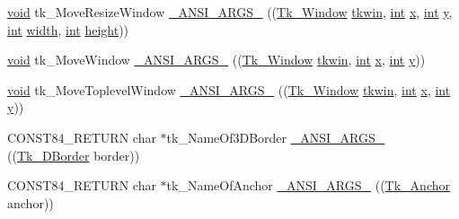 \begin{DoxyCompactItemize}
\item 
\hyperlink{tk_8h_aba408b7cd755a96426e004c015f5de8e}{void} tk\+\_\+\+Move\+Resize\+Window \hyperlink{struct_tk_stubs_aa3b45fa26bcd8bb64b33075c9c378c23}{\+\_\+\+A\+N\+S\+I\+\_\+\+A\+R\+G\+S\+\_\+} ((\hyperlink{tk_8h_ab756137de3ee74edc2501bd0d761e37c}{Tk\+\_\+\+Window} \hyperlink{tk_8h_a35df722e7e1b6efd651683b8be7c1490}{tkwin}, \hyperlink{tk_8h_a83f82f76e7fed06f4c49d2db94028a6d}{int} \hyperlink{tk_8h_a61ebd54d47cc56787649a3b8f126bda1}{x}, \hyperlink{tk_8h_a83f82f76e7fed06f4c49d2db94028a6d}{int} \hyperlink{tk_8h_a40f4f3601c0eaa8ca46b1a164264696d}{y}, \hyperlink{tk_8h_a83f82f76e7fed06f4c49d2db94028a6d}{int} \hyperlink{tk_8h_a29e50a5401c1396b3a2aa3487f74d468}{width}, \hyperlink{tk_8h_a83f82f76e7fed06f4c49d2db94028a6d}{int} \hyperlink{tk_8h_a67be2f4b9d9c5b3559139bfb072e2e81}{height}))
\item 
\hyperlink{tk_8h_aba408b7cd755a96426e004c015f5de8e}{void} tk\+\_\+\+Move\+Window \hyperlink{struct_tk_stubs_a315704b61e9a1ca82adff2f37e0078a0}{\+\_\+\+A\+N\+S\+I\+\_\+\+A\+R\+G\+S\+\_\+} ((\hyperlink{tk_8h_ab756137de3ee74edc2501bd0d761e37c}{Tk\+\_\+\+Window} \hyperlink{tk_8h_a35df722e7e1b6efd651683b8be7c1490}{tkwin}, \hyperlink{tk_8h_a83f82f76e7fed06f4c49d2db94028a6d}{int} \hyperlink{tk_8h_a61ebd54d47cc56787649a3b8f126bda1}{x}, \hyperlink{tk_8h_a83f82f76e7fed06f4c49d2db94028a6d}{int} \hyperlink{tk_8h_a40f4f3601c0eaa8ca46b1a164264696d}{y}))
\item 
\hyperlink{tk_8h_aba408b7cd755a96426e004c015f5de8e}{void} tk\+\_\+\+Move\+Toplevel\+Window \hyperlink{struct_tk_stubs_a79a74ac86bbebb79aea754080de6df21}{\+\_\+\+A\+N\+S\+I\+\_\+\+A\+R\+G\+S\+\_\+} ((\hyperlink{tk_8h_ab756137de3ee74edc2501bd0d761e37c}{Tk\+\_\+\+Window} \hyperlink{tk_8h_a35df722e7e1b6efd651683b8be7c1490}{tkwin}, \hyperlink{tk_8h_a83f82f76e7fed06f4c49d2db94028a6d}{int} \hyperlink{tk_8h_a61ebd54d47cc56787649a3b8f126bda1}{x}, \hyperlink{tk_8h_a83f82f76e7fed06f4c49d2db94028a6d}{int} \hyperlink{tk_8h_a40f4f3601c0eaa8ca46b1a164264696d}{y}))
\item 
C\+O\+N\+S\+T84\+\_\+\+R\+E\+T\+U\+RN char $\ast$tk\+\_\+\+Name\+Of3\+D\+Border \hyperlink{struct_tk_stubs_a1a82a14d82a33ea1117b81c3c1fdcbb5}{\+\_\+\+A\+N\+S\+I\+\_\+\+A\+R\+G\+S\+\_\+} ((\hyperlink{tk_8h_a7691523098431859a6f7514f1422e545}{Tk\+\_\+D\+Border} border))
\item 
C\+O\+N\+S\+T84\+\_\+\+R\+E\+T\+U\+RN char $\ast$tk\+\_\+\+Name\+Of\+Anchor \hyperlink{struct_tk_stubs_ab494a69b0da2f210fe8851274622fca4}{\+\_\+\+A\+N\+S\+I\+\_\+\+A\+R\+G\+S\+\_\+} ((\hyperlink{tk_8h_a808936cc13d4585115aa0be26f21a167}{Tk\+\_\+\+Anchor} anchor))

\end{DoxyCompactItemize}
